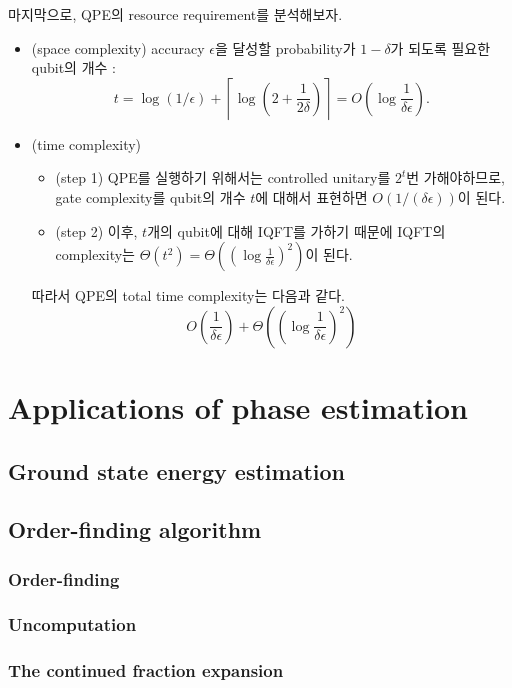 \vspace{1em}
마지막으로, QPE의 resource requirement를 분석해보자. 
\begin{itemize}
  \item (space complexity) accuracy $\epsilon$을 달성할 probability가 $1-\delta$가 되도록 필요한 qubit의 개수 :
  \begin{equation*}
    t=\log (1 / \epsilon)+\left\lceil\log \left(2+\frac{1}{2 \delta}\right)\right\rceil=O\left(\log \frac{1}{\delta \epsilon}\right) .
    \end{equation*}
  \item (time complexity) 
  \begin{itemize}
    \item (step 1) QPE를 실행하기 위해서는 controlled unitary를 $2^t$번 가해야하므로, gate complexity를 qubit의 개수 $t$에 대해서 표현하면 $O(1/(\delta \epsilon))$이 된다.
    \item (step 2) 이후, $t$개의 qubit에 대해 IQFT를 가하기 때문에 IQFT의 complexity는 $\Theta(t^2) = \Theta((\log \frac{1}{\delta \epsilon})^2)$이 된다.
  \end{itemize}
  따라서 QPE의 total time complexity는 다음과 같다.
  \begin{equation*}
    O\left(\frac{1}{\delta \epsilon} \right) + \Theta\left(\left(\log \frac{1}{\delta \epsilon}\right)^2\right)
  \end{equation*}
\end{itemize}

\section{Applications of phase estimation}
\subsection{Ground state energy estimation}
\subsection{Order-finding algorithm}
\subsubsection{Order-finding}
\subsubsection{Uncomputation}
\subsubsection{The continued fraction expansion}

